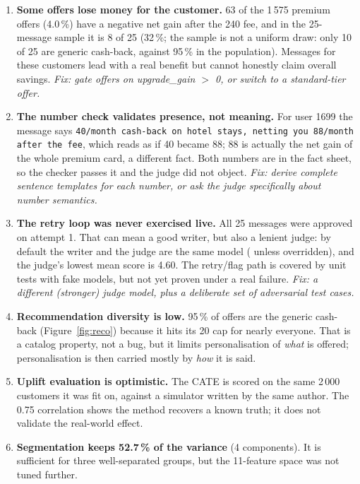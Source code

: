 \documentclass[11pt,a4paper]{article}
\newcommand{\eur}{\texttt{\texteuro}}
\newcommand{\code}[1]{\texttt{\detokenize{#1}}}
\begin{document}
\begin{warnbox}
\begin{enumerate}[leftmargin=14pt]
\item \textbf{Some offers lose money for the customer.} 63 of the 1\,575 premium offers (4.0\,\%) have a negative net gain after the \eur 240 fee, and in the 25-message sample it is 8 of 25 (32\,\%; the sample is not a uniform draw: only 10 of 25 are generic cash-back, against 95\,\% in the population). Messages for these customers lead with a real benefit but cannot honestly claim overall savings. \emph{Fix: gate offers on upgrade\_gain $>$ 0, or switch to a standard-tier offer.}
\item \textbf{The number check validates presence, not meaning.} For user 1699 the message says \texttt{\eur40/month cash-back on hotel stays, netting you \eur88/month after the fee}, which reads as if \eur40 became \eur88; \eur88 is actually the net gain of the whole premium card, a different fact. Both numbers are in the fact sheet, so the checker passes it and the judge did not object. \emph{Fix: derive complete sentence templates for each number, or ask the judge specifically about number semantics.}
\item \textbf{The retry loop was never exercised live.} All 25 messages were approved on attempt 1. That can mean a good writer, but also a lenient judge: by default the writer and the judge are the same model (\code{openai/gpt-4o-mini} unless overridden), and the judge's lowest mean score is 4.60. The retry/flag path is covered by unit tests with fake models, but not yet proven under a real failure. \emph{Fix: a different (stronger) judge model, plus a deliberate set of adversarial test cases.}
\item \textbf{Recommendation diversity is low.} 95\,\% of offers are the generic cash-back (Figure~\ref{fig:reco}) because it hits its \eur 20 cap for nearly everyone. That is a catalog property, not a bug, but it limits personalisation of \emph{what} is offered; personalisation is then carried mostly by \emph{how} it is said.
\item \textbf{Uplift evaluation is optimistic.} The CATE is scored on the same 2\,000 customers it was fit on, against a simulator written by the same author. The 0.75 correlation shows the method recovers a known truth; it does not validate the real-world effect.
\item \textbf{Segmentation keeps 52.7\,\% of the variance} (4 components). It is sufficient for three well-separated groups, but the 11-feature space was not tuned further.
\end{enumerate}
\end{warnbox}
\end{document}
